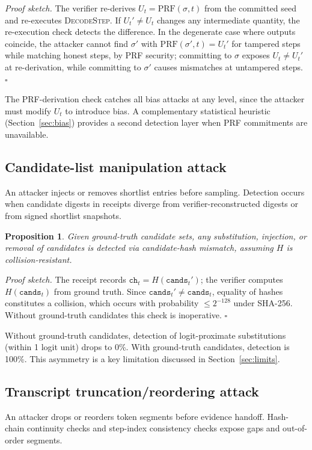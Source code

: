 \documentclass[conference]{IEEEtran}
\newtheorem{proposition}{Proposition}
\newcommand{\proc}[1]{\textnormal{\textsc{#1}}}
\begin{document}
\textit{Proof sketch.}
The verifier re-derives $U_t=\mathrm{PRF}(\sigma,t)$ from the committed seed and re-executes \proc{DecodeStep}. If $U_t'\!\neq\!U_t$ changes any intermediate quantity, the re-execution check detects the difference. In the degenerate case where outputs coincide, the attacker cannot find $\sigma'$ with $\mathrm{PRF}(\sigma',t)=U_t'$ for tampered steps while matching honest steps, by PRF security; committing to $\sigma$ exposes $U_t\!\neq\!U_t'$ at re-derivation, while committing to $\sigma'$ causes mismatches at untampered steps.
\hfill$\square$

The PRF-derivation check catches all bias attacks at any level, since the attacker must modify $U_t$ to introduce bias. A complementary statistical heuristic (Section~\ref{sec:bias}) provides a second detection layer when PRF commitments are unavailable.

\subsection{Candidate-list manipulation attack}
An attacker injects or removes shortlist entries before sampling. Detection occurs when candidate digests in receipts diverge from verifier-reconstructed digests or from signed shortlist snapshots.

\begin{proposition}\label{prop:cand}
Given ground-truth candidate sets, any substitution, injection, or removal of candidates is detected via candidate-hash mismatch, assuming $H$ is collision-resistant.
\end{proposition}

\textit{Proof sketch.}
The receipt records $\texttt{ch}_t = H(\texttt{cands}_t')$; the verifier computes $H(\texttt{cands}_t)$ from ground truth. Since $\texttt{cands}_t'\!\neq\!\texttt{cands}_t$, equality of hashes constitutes a collision, which occurs with probability $\leq 2^{-128}$ under SHA-256. Without ground-truth candidates this check is inoperative.
\hfill$\square$

Without ground-truth candidates, detection of logit-proximate substitutions (within 1 logit unit) drops to 0\%. With ground-truth candidates, detection is 100\%. This asymmetry is a key limitation discussed in Section~\ref{sec:limits}.

\subsection{Transcript truncation/reordering attack}
An attacker drops or reorders token segments before evidence handoff. Hash-chain continuity checks and step-index consistency checks expose gaps and out-of-order segments.
\end{document}
